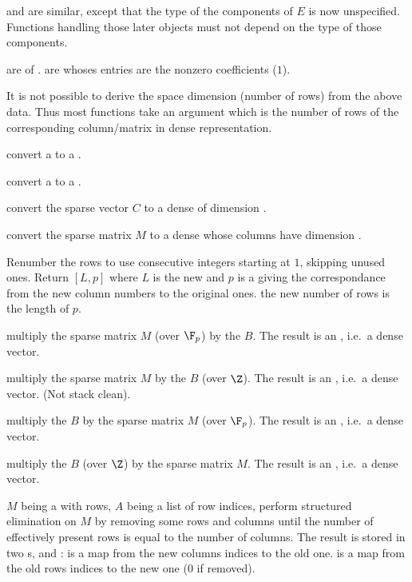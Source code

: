  and  are similar, except that the type of the components
of $E$ is now unspecified. Functions handling those later objects
must not depend on the type of those components.

 are  of .  are  whoses
entries are the nonzero coefficients ($1$).

It is not possible to derive the space dimension (number of rows) from the
above data. Thus most functions take an argument  which is the
number of rows of the corresponding column/matrix in dense representation.

 convert a  to a .

 convert a  to a .

 convert the sparse vector $C$
to a dense  of dimension .

 convert the sparse matrix $M$
to a dense  whose columns have dimension .

Renumber the rows to use consecutive integers starting at $1$, skipping unused ones.
Return $[L,p]$ where $L$ is the new  and $p$ is a  giving
the correspondance from the new column numbers to the original ones.
the new number of rows is the length of $p$.

 multiply the sparse matrix $M$
(over $\F_p$) by the  $B$. The result is an , i.e.~a
dense vector.

 multiply the sparse matrix $M$
by the  $B$ (over $\Z$). The result is an , i.e.~a
dense vector. (Not stack clean).

 multiply the  $B$
by the sparse matrix $M$ (over $\F_p$). The result is an , i.e.~a
dense vector.

 multiply the   $B$ (over
$\Z$) by the sparse matrix $M$. The result is an , i.e.~a
dense vector.

$M$ being a  with  rows, $A$ being a list of row indices,
perform structured elimination on $M$ by removing some rows and columns until
the number of effectively present rows is equal to the number of columns.
The result is stored in two s,  and :
 is a map from the new columns indices to the old one.
 is a map from the old rows indices to the new one ($0$ if removed).

